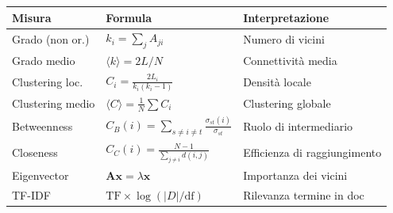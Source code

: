 \documentclass[12pt,a4paper]{article}
\begin{document}
\begin{center}
\begin{tabular}{lll}
  \toprule
  \textbf{Misura} & \textbf{Formula} & \textbf{Interpretazione} \\
  \midrule
  Grado (non or.) & $k_i = \sum_j A_{ji}$ & Numero di vicini \\
  Grado medio & $\langle k \rangle = 2L/N$ & Connettività media \\
  Clustering loc. & $C_i = \frac{2L_i}{k_i(k_i-1)}$ & Densità locale \\
  Clustering medio & $\langle C \rangle = \frac{1}{N}\sum C_i$ & Clustering globale \\
  Betweenness & $C_B(i) = \sum_{s\neq i \neq t} \frac{\sigma_{st}(i)}{\sigma_{st}}$
              & Ruolo di intermediario \\
  Closeness & $C_C(i) = \frac{N-1}{\sum_{j\neq i}d(i,j)}$ & Efficienza di raggiungimento \\
  Eigenvector & $\mathbf{A}\mathbf{x} = \lambda\mathbf{x}$ & Importanza dei vicini \\
  TF-IDF & $\text{TF}\times\log(|D|/\text{df})$ & Rilevanza termine in doc \\
  \bottomrule
\end{tabular}
\end{center}
\end{document}
